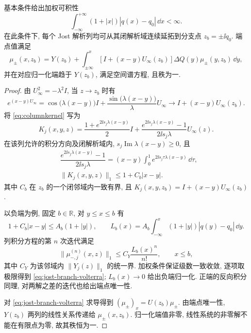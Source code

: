 \begin{lemma}\label{prop:jost-branch}
基本条件给出加权可积性
\begin{equation}\label{eq:jost-weighted}
\int_{-\infty}^{+\infty}(1+|x|)|q(x)-q_0|\,\dd x<\infty.
\end{equation}
在此条件下, 每个 Jost 解析列均可从其闭解析域连续延拓到分支点 $z_b=\pm\ii q_0$. 端点值满足
\begin{equation}\label{eq:jost-branch-volterra}
\mu_\pm(x,z_b)=Y(z_b)+\int_{\pm\infty}^{x}
[I+(x-y)U_\infty(z_b)]\Delta Q(y)\mu_\pm(y,z_b)\,\dd y,
\end{equation}
并在对应归一化端趋于 $Y(z_b)$, 满足空间谱方程, 且秩为一.
\end{lemma}
\begin{proof}
由 $U_\infty^2=-\lambda^2I$, 当 $z\to z_b$ 时有
\begin{equation}\label{eq:background-propagator}
e^{(x-y)U_\infty}
=\cos\bigl(\lambda(x-y)\bigr)I+\dfrac{\sin\bigl(\lambda(x-y)\bigr)}{\lambda}U_\infty
\longrightarrow I+(x-y)U_\infty(z_b).
\end{equation}
将 \eqref{eq:columnkernel} 写为
\begin{equation}\label{eq:branch-columnkernel}
K_j(x,y,z)=\dfrac{1+e^{2\ii s_j\lambda(x-y)}}{2}I
+\dfrac{e^{2\ii s_j\lambda(x-y)}-1}{2\ii s_j\lambda}U_\infty(z).
\end{equation}
在该列允许的积分方向及闭解析域内, $s_j\operatorname{Im}\lambda\,(x-y)\ge0$, 且
\begin{equation*}
\begin{aligned}
&\dfrac{e^{2\ii s_j\lambda(x-y)}-1}{2\ii s_j\lambda}
=(x-y)\int_0^1 e^{2\ii s_j\tau\lambda(x-y)}\,\dd\tau,\\
&\|K_j(x,y,z)\|_1\le1+C_b|x-y|.
\end{aligned}
\end{equation*}
其中 $C_b$ 在 $z_b$ 的一个闭邻域内一致有界, 且 $K_j(x,y,z_b)=I+(x-y)U_\infty(z_b)$.

以负端为例, 固定 $b\in\mathbb R$, 对 $y\le x\le b$ 有
\begin{equation*}
1+C_b|x-y|\le A_b(1+|y|),\qquad
L_b(x)=A_b\int_{-\infty}^{x}(1+|y|)|q(y)-q_0|\,\dd y.
\end{equation*}
列积分方程的第 $n$ 次迭代满足
\begin{equation*}
\|\mu_{-,j}^{(n)}(x,z)\|_1
\le C_Y\dfrac{L_b(x)^n}{n!},\qquad x\le b,
\end{equation*}
其中 $C_Y$ 为该邻域内 $\|Y_j(z)\|_1$ 的统一界. 加权条件保证级数一致收敛, 逐项取极限得到 \eqref{eq:jost-branch-volterra}; $L_b(x)\to0$ 给出负端归一化. 正端的反向积分同理, 对两解之差的迭代也给出端点唯一性.

对 \eqref{eq:jost-branch-volterra} 求导得到 $(\mu_\pm)_x=U(z_b)\mu_\pm$. 由端点唯一性, $Y(z_b)$ 两列的线性关系传递给 $\mu_\pm(x,z_b)$. 归一化端值非零, 线性系统的非零解不能在有限点为零, 故其秩恒为一.
\end{proof}

